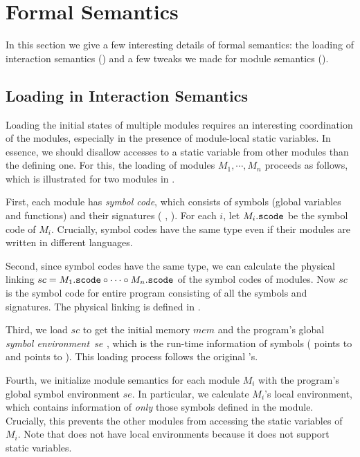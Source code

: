 \section{Formal Semantics}
\label{sec:compiler:semantics}

In this section we give a few interesting details of formal semantics: the loading of interaction
semantics () and a few tweaks we made for module semantics
().


\subsection{Loading in Interaction Semantics}
\label{sec:main-semantics:loading}



Loading the initial states of multiple modules requires an interesting
coordination of the modules, especially in the presence of module-local static variables.  In essence, we
should disallow accesses to a static variable from other modules than the defining one.  For
this, the loading of modules $M_1, \cdots, M_n$ proceeds as follows, which is illustrated for two
modules in .

First, each module has \emph{symbol code}, which consists of symbols (\ie global variables and functions) and their
signatures (\eg{} , ).  For each $i$, let $M_i.\texttt{scode}$ be the
symbol code of $M_i$.  Crucially, symbol codes have the same type even if their modules are written
in different languages.

Second, since symbol codes have the same type, we can calculate the physical linking
$sc = M_1.\texttt{scode} \circ \cdots \circ M_n.\texttt{scode}$ of the symbol codes of modules.  Now
$sc$ is the symbol code for entire program consisting of all the symbols and signatures.  The
physical linking is defined in \cite{kang:scc}.

Third, we load $sc$ to get the initial memory $mem$ 
and the program's global \emph{symbol environment}~$se$ ,
which is the run-time information of symbols (\eg{}  points to
 and  points to ).  This loading process follows the original \cc{}'s.

Fourth, we initialize module semantics for each module $M_i$ with the program's global symbol
environment $se$.  In particular, we calculate $M_i$'s local environment, which contains information
of \emph{only} those symbols defined in the module.  Crucially, this prevents the other modules from
accessing the static variables of $M_i$. Note that \ccc{} does not have local environments because it does not support static variables.

